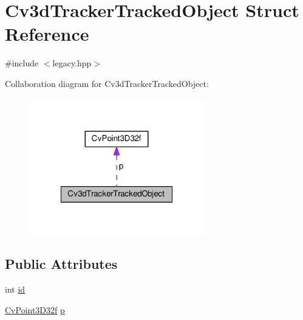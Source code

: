 \hypertarget{structCv3dTrackerTrackedObject}{\section{Cv3d\-Tracker\-Tracked\-Object Struct Reference}
\label{structCv3dTrackerTrackedObject}
}


{\ttfamily \#include $<$legacy.\-hpp$>$}



Collaboration diagram for Cv3d\-Tracker\-Tracked\-Object\-:\nopagebreak
\begin{figure}[H]
\begin{center}
\leavevmode
\includegraphics[width=216pt]{structCv3dTrackerTrackedObject__coll__graph}
\end{center}
\end{figure}
\subsection*{Public Attributes}
\begin{DoxyCompactItemize}
\item 
int \hyperlink{structCv3dTrackerTrackedObject_ae9f2abd95cf68322777a0944201dccdc}{id}
\item 
\hyperlink{structCvPoint3D32f}{Cv\-Point3\-D32f} \hyperlink{structCv3dTrackerTrackedObject_a406b9a7685966c258801d7b451a9f41e}{p}
\end{DoxyCompactItemize}


